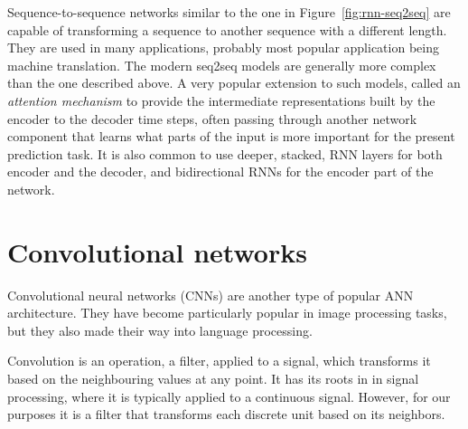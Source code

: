 Sequence-to-sequence networks similar to the one in Figure~\ref{fig:rnn-seq2seq}
are capable of transforming a sequence
to another sequence with a different length.
They are used in many applications,
probably most popular application being machine translation.
The modern seq2seq models are generally more complex than
the one described above.  
A very popular extension to such models,
called an \emph{attention mechanism}
to provide the intermediate representations built by the encoder
to the decoder time steps,
often passing through another network component that learns
what parts of the input is more important for the present prediction task.
It is also common to use deeper, stacked,
RNN layers for both encoder and the decoder,
and bidirectional RNNs for the encoder part of the network.%

\section{Convolutional networks}

Convolutional neural networks (CNNs) are another type of popular ANN architecture.
They have become particularly popular in image processing tasks,
but they also made their way into language processing.

Convolution is an operation, a filter, applied to a signal,
which transforms it based on the neighbouring values at any point.
It has its roots in in signal processing,
where it is typically applied to a continuous signal.
However, for our purposes it is a filter that transforms each discrete unit
based on its neighbors.

